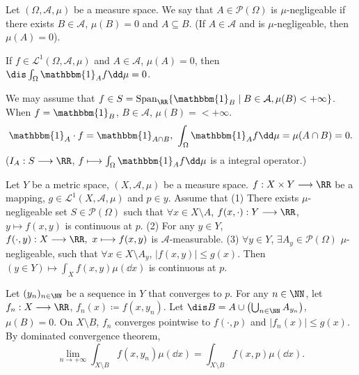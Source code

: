 \begin{definitionenv}
    Let $(\Omega,\mathcal{A},\mu)$ be a measure space. We say that $A\in \mathscr{P}(\Omega)$ is $\mu$-negligeable if there exists $B\in \mathcal{A}$, $\mu(B)=0$ and $A\subseteq B$.
    (If $A\in\mathcal{A}$ and is $\mu$-negligeable, then $\mu(A)=0$).
\end{definitionenv}
\begin{propositionenv}
    If $f\in \mathcal{L}^1(\Omega,\mathcal{A}, \mu)$ and $A\in \mathcal{A}$, $\mu(A)=0$, then $\dis \int_{\Omega} \mathbbm{1}_A f\dd\mu=0$.
\end{propositionenv}
\begin{proofenv}
    We may assume that $f\in S=\mathrm{Span}_{\RR}\{\mathbbm{1}_{B}\mid B\in \mathcal{A},\mu(B)<+\infty\}$. When $f=\mathbbm{1}_B$, $B\in \mathcal{A}$, $\mu(B)=<+\infty$.
    $$ \mathbbm{1}_{A}\cdot f=\mathbbm{1}_{A\cap B},\ \int_{\Omega} \mathbbm{1}_{A} f \dd\mu =\mu(A\cap B)=0.$$
    ($I_A: S\longrightarrow \RR$, $f\longmapsto \int_{\Omega} \mathbbm{1}_A  f \dd\mu$ is a integral operator.)
\end{proofenv}
\begin{theoremenv}
    Let $Y$ be a metric space, $(X,\mathcal{A}, \mu)$ be a measure space. $f:X\times Y\longrightarrow \RR$ be a mapping, $g\in \mathcal{L}^1(X,\mathcal{A},\mu)$ and $p\in y$. Assume that
    \newline
    (1) There exists $\mu$-negligeable set $S\in \mathscr{P}(\Omega)$ such that $\forall x\in X\setminus A$, $f(x,\cdot): Y\longrightarrow \RR$, $y\longmapsto f(x,y)$ is continuous at $p$.
    \newline
    (2) For any $y\in Y$, $f(\cdot,y): X\longrightarrow \RR,\ x\longmapsto f(x,y)$ is $\mathcal{A}$-measurable.
    \newline
    (3) $\forall y\in Y$, $\exists A_y\in \mathscr{P}(\Omega)$ $\mu$-negligeable, such that $\forall x\in X\setminus A_y$, $|f(x,y)|\le g(x)$. Then $(y\in Y)\longmapsto \int_{X}f(x,y)\mu(\dd x)$ is continuous at $p$.
\end{theoremenv}
\begin{proofenv}
    Let $(y_n)_{n\in\NN}$ be a sequence in $Y$ that converges to $p$. For any $n\in \NN$, let $f_n:X\longrightarrow \RR$, $f_n(x)\coloneq f(x,y_n).$
    Let $\dis B=A\cup\left(\bigcup_{n\in \NN} A_{y_n}\right)$, $\mu(B)=0$.
    On $X\setminus B$, $f_n$ converges pointwise to $f(\cdot,p)$ and $|f_n(x)|\le g(x)$.
    By dominated convergence theorem,
    $$ \lim_{n\rightarrow +\infty} \int_{X\setminus B} f(x,y_n)\mu(\dd x)=\int_{X\setminus B} f(x,p)\mu(\dd x).$$
\end{proofenv}
